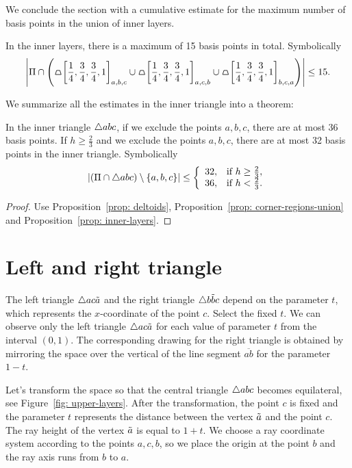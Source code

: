 We conclude the section with a cumulative estimate for the maximum number of basis points in the union of inner layers.

\begin{proposition}
\label{prop: inner-layers}
In the inner layers, there is a maximum of 15 basis points in total. Symbolically
$$
\left|
\Pi \cap \left(
\tpz{\left[ \frac{1}{4},\frac{3}{4},\frac{3}{4},1 \right]_{a,b,c} } \cup
\tpz{\left[ \frac{1}{4},\frac{3}{4},\frac{3}{4},1 \right]_{a,c,b} } \cup
\tpz{\left[ \frac{1}{4},\frac{3}{4},\frac{3}{4},1 \right]_{b,c,a} }
\right)
\right|
\leq 15.
$$
\end{proposition}

We summarize all the estimates in the inner triangle into a theorem:
\begin{theorem}
In the inner triangle $\triangle{abc}$, if we exclude the points $a,b,c$, there are at most 36 basis points. If $h \geq \frac{2}{3}$ and we exclude the points $a,b,c$, there are at most 32 basis points in the inner triangle. Symbolically
$$
\left|\left(\Pi \cap \triangle{abc}\right) \setminus \left\{ a,b,c \right\}\right| \leq \left\{ \begin{array}{ll}  32,  & \mbox{if } h \geq \frac{2}{3}, \\  36,  & \mbox{if } h < \frac{2}{3}. \end{array} \right.
$$
\end{theorem}
\begin{proof}
Use Proposition~\ref{prop: deltoids}, Proposition~\ref{prop: corner-regions-union} and Proposition~\ref{prop: inner-layers}.
\end{proof}

\section{Left and right triangle}
The left triangle $\triangle{ac\tilde{a}}$ and the right triangle $\triangle{b\tilde{b}c}$ depend on the parameter $t$, which represents the $x$-coordinate of the point $c$. Select the fixed $t$. We can observe only the left triangle $\triangle{ac\tilde{a}}$ for each value of parameter $t$ from the interval $(0, 1)$. The corresponding drawing for the right triangle is obtained by mirroring the space over the vertical of the line segment $\overline{ab}$ for the parameter $1 - t$.

Let's transform the space so that the central triangle $\triangle{abc}$ becomes equilateral, see Figure~\ref{fig: upper-layers}. After the transformation, the point $c$ is fixed and the parameter $t$ represents the distance between the vertex $\tilde{a}$ and the point $c$. The ray height of the vertex $\tilde{a}$ is equal to $1 + t$. We choose a ray coordinate system according to the points $a,c,b$, so we place the origin at the point $b$ and the ray axis runs from $b$ to $a$.

